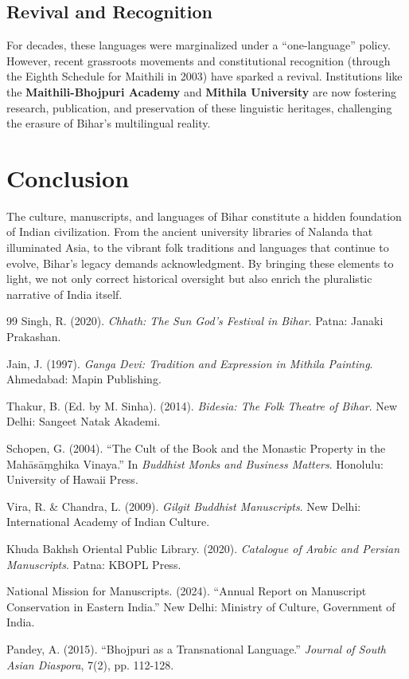 \documentclass{article}
\begin{document}
\subsection{Revival and Recognition}
For decades, these languages were marginalized under a “one-language” policy. However, recent grassroots movements and constitutional recognition (through the Eighth Schedule for Maithili in 2003) have sparked a revival. Institutions like the \textbf{Maithili-Bhojpuri Academy} and \textbf{Mithila University} are now fostering research, publication, and preservation of these linguistic heritages, challenging the erasure of Bihar’s multilingual reality.

\section*{Conclusion}
The culture, manuscripts, and languages of Bihar constitute a hidden foundation of Indian civilization. From the ancient university libraries of Nalanda that illuminated Asia, to the vibrant folk traditions and languages that continue to evolve, Bihar’s legacy demands acknowledgment. By bringing these elements to light, we not only correct historical oversight but also enrich the pluralistic narrative of India itself.

\begin{thebibliography}{99}
 Singh, R. (2020). \textit{Chhath: The Sun God’s Festival in Bihar}. Patna: Janaki Prakashan.

 Jain, J. (1997). \textit{Ganga Devi: Tradition and Expression in Mithila Painting}. Ahmedabad: Mapin Publishing.

 Thakur, B. (Ed. by M. Sinha). (2014). \textit{Bidesia: The Folk Theatre of Bihar}. New Delhi: Sangeet Natak Akademi.

 Schopen, G. (2004). “The Cult of the Book and the Monastic Property in the Mahāsāṃghika Vinaya.” In \textit{Buddhist Monks and Business Matters}. Honolulu: University of Hawaii Press.

 Vira, R. \& Chandra, L. (2009). \textit{Gilgit Buddhist Manuscripts}. New Delhi: International Academy of Indian Culture.

 Khuda Bakhsh Oriental Public Library. (2020). \textit{Catalogue of Arabic and Persian Manuscripts}. Patna: KBOPL Press.

 National Mission for Manuscripts. (2024). “Annual Report on Manuscript Conservation in Eastern India.” New Delhi: Ministry of Culture, Government of India.

 Pandey, A. (2015). “Bhojpuri as a Transnational Language.” \textit{Journal of South Asian Diaspora}, 7(2), pp. 112-128.

\end{thebibliography}
\end{document}
